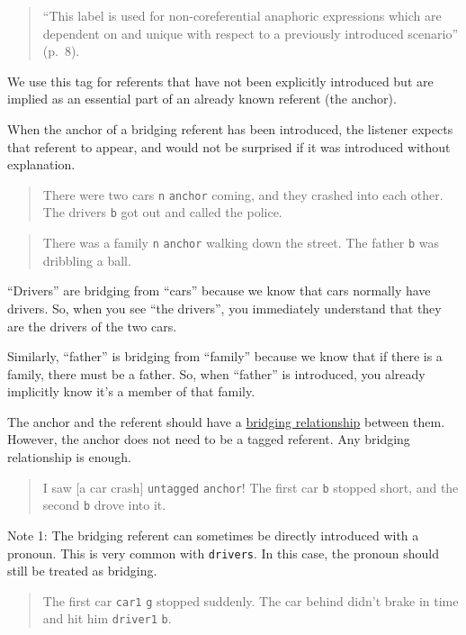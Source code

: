 \documentclass[
]{book}
\begin{document}
\begin{quote}
``This label is used for non-coreferential anaphoric expressions which are dependent on and unique with respect to a previously introduced scenario'' (p.~8).
\end{quote}

We use this tag for referents that have not been explicitly introduced but are implied as an essential part of an already known referent (the anchor).

When the anchor of a bridging referent has been introduced,
the listener expects that referent to appear,
and would not be surprised if it was introduced without explanation.

\begin{quote}
There were two cars \texttt{n} \texttt{anchor} coming, and they crashed into each other.
The drivers \texttt{b} got out and called the police.
\end{quote}

\begin{quote}
There was a family \texttt{n} \texttt{anchor} walking down the street.
The father \texttt{b} was dribbling a ball.
\end{quote}

``Drivers'' are bridging from ``cars'' because we know that cars normally have drivers.
So, when you see ``the drivers'', you immediately understand that they are the drivers of the two cars.

Similarly, ``father'' is bridging from ``family'' because we know that if there is a family, there must be a father.
So, when ``father'' is introduced, you already implicitly know it's a member of that family.

The anchor and the referent should have a
\protect\hyperlink{bridgingux5cux2520relationship}{bridging relationship} between them.
However, the anchor does not need to be a tagged referent.
Any bridging relationship is enough.

\begin{quote}
I saw {[}a car crash{]} \texttt{untagged} \texttt{anchor}!
The first car \texttt{b} stopped short, and the second \texttt{b} drove into it.
\end{quote}

Note 1:
The bridging referent can sometimes be directly introduced with a pronoun.
This is very common with \texttt{drivers}.
In this case, the pronoun should still be treated as bridging.

\begin{quote}
The first car \texttt{car1} \texttt{g} stopped suddenly.
The car behind didn't brake in time and hit him \texttt{driver1} \texttt{b}.
\end{quote}
\end{document}
